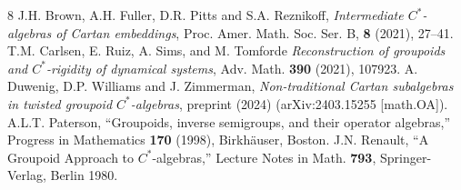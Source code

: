 \documentclass[a4paper, 12pt]{amsart}
\theoremstyle{plain}
\theoremstyle{definition}
\theoremstyle{remark}
\numberwithin{equation}{section}
\begin{document}
\begin{thebibliography}{8}
 J.H. Brown, A.H. Fuller, D.R. Pitts and S.A. Reznikoff,
    \emph{Intermediate $C^*$-algebras of Cartan embeddings}, Proc. Amer.
    Math. Soc. Ser. B, \textbf{8} (2021), 27--41.
 T.M. Carlsen, E. Ruiz, A. Sims, and M. Tomforde
    \emph{Reconstruction of groupoids and $C^*$-rigidity of dynamical systems},
    Adv. Math. \textbf{390} (2021), 107923.
 A. Duwenig, D.P. Williams and J. Zimmerman,
    \emph{Non-traditional Cartan subalgebras in twisted groupoid
    $C^*$-algebras}, preprint (2024) (arXiv:2403.15255 [math.OA]).
 A.L.T. Paterson, ``Groupoids, inverse semigroups, and
    their operator algebras,'' Progress in Mathematics \textbf{170} (1998),
    Birkh\"auser, Boston.
 J.N. Renault, ``A Groupoid Approach to $C^*$-algebras,''
    Lecture Notes in Math. \textbf{793}, Springer-Verlag, Berlin 1980.
\end{thebibliography}
\end{document}
